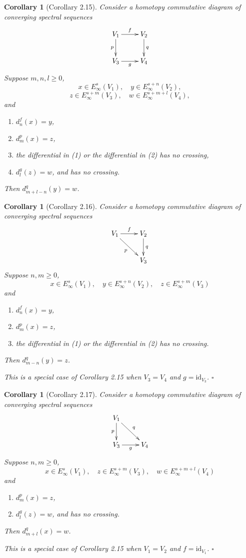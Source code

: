 \documentclass[12pt,a4paper]{article}
\renewenvironment{proof}{{\noindent\it\textbf{Proof}}\quad\it}{\hfill$\square$}
\newtheorem{cor}[equation]{Corollary}
\begin{document}
\begin{sloppy}
\begin{cor}[Corollary 2.15]
Consider a homotopy commutative diagram of converging spectral sequences
$$\xymatrix{
V_1 \ar[r]^{f}\ar[d]_{p} & V_2\ar[d]^{q}\\
V_3 \ar[r]_{g} & V_4}$$
Suppose $m,n,l\ge 0$,
$$x\in E^{s}_\infty(V_1), \quad y\in E^{s+n}_\infty(V_2),$$
$$z\in E^{s+m}_\infty(V_3), \quad w\in E^{s+m+l}_\infty(V_4),$$
and
\begin{enumerate}
\item[(1)] $d^{f}_{n}(x)=y$,
\item[(2)] $d^{p}_{m}(x)=z$,
\item[(3)] the differential in (1) or the differential in (2) has no crossing,
\item[(4)] $d^{g}_{l}(z)=w$, and has no crossing.
\end{enumerate}
Then $d^{q}_{m+l-n}(y)=w$.
\end{cor}

\begin{cor}[Corollary 2.16]
Consider a homotopy commutative diagram of converging spectral sequences
$$\xymatrix{V_1 \ar[r]^f \ar[dr]_p & V_2 \ar[d]^q \\ & V_3}$$
Suppose $n, m \geq 0$,
$$x \in E_\infty^{s}(V_1), \quad y \in E_\infty^{s+n}(V_2), \quad z \in E_\infty^{s+m}(V_3)$$
and
\begin{enumerate}
\item[(1)] $d_n^f(x) = y$,
\item[(2)] $d_m^p(x) = z$,
\item[(3)] the differential in (1) or the differential in (2) has no crossing.
\end{enumerate}
Then $d_{m-n}^q(y) = z$.
\end{cor}
\begin{proof}
This is a special case of Corollary 2.15 when $V_3 = V_4$ and $g = \mathrm{id}_{V_3}$.
\end{proof}

\begin{cor}[Corollary 2.17]
Consider a homotopy commutative diagram of converging spectral sequences
$$\xymatrix{
V_1 \ar[d]_{p}\ar[dr]^{q} & \\
V_3\ar[r]_{g} & V_4
}$$
Suppose $n,m\ge 0$,
$$x\in E^{s}_\infty(V_1), \quad z\in E^{s+m}_\infty(V_3), \quad w\in E^{s+m+l}_\infty(V_4)$$
and
\begin{enumerate}
\item[(1)] $d^{p}_{m}(x)=z$,
\item[(2)] $d^{g}_{l}(z)=w$, and has no crossing.
\end{enumerate}
Then $d^{q}_{m+l}(x)=w$.
\end{cor}
\begin{proof}
This is a special case of Corollary 2.15 when $V_1=V_2$ and $f=\mathrm{id}_{V_1}$.
\end{proof}


\end{sloppy}
\end{document}
